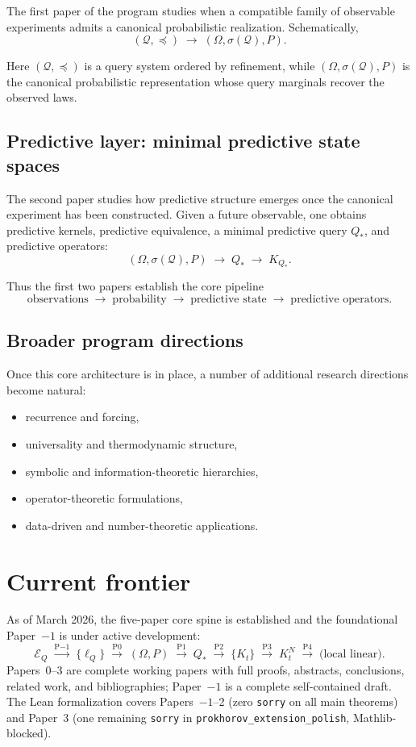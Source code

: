 \documentclass[11pt]{article}
\begin{document}
The first paper of the program studies when a compatible family of
observable experiments admits a canonical probabilistic realization.
Schematically,
\[
(\mathcal Q,\preceq)
\;\longrightarrow\;
(\Omega,\sigma(\mathcal Q),P).
\]

Here $(\mathcal Q,\preceq)$ is a query system ordered by refinement,
while $(\Omega,\sigma(\mathcal Q),P)$ is the canonical probabilistic
representation whose query marginals recover the observed laws.

\subsection{Predictive layer: minimal predictive state spaces}

The second paper studies how predictive structure emerges once the
canonical experiment has been constructed.  Given a future observable,
one obtains predictive kernels, predictive equivalence, a minimal
predictive query $Q_*$, and predictive operators:
\[
(\Omega,\sigma(\mathcal Q),P)
\;\longrightarrow\;
Q_*
\;\longrightarrow\;
K_{Q_*}.
\]

Thus the first two papers establish the core pipeline
\[
\text{observations}
\;\longrightarrow\;
\text{probability}
\;\longrightarrow\;
\text{predictive state}
\;\longrightarrow\;
\text{predictive operators}.
\]

\subsection{Broader program directions}

Once this core architecture is in place, a number of additional research
directions become natural:
\begin{itemize}
\item recurrence and forcing,
\item universality and thermodynamic structure,
\item symbolic and information-theoretic hierarchies,
\item operator-theoretic formulations,
\item data-driven and number-theoretic applications.
\end{itemize}

\section{Current frontier}

As of March 2026, the five-paper core spine is established and the
foundational Paper~$-1$ is under active development:
\[
\mathcal E_Q
\;\xrightarrow{\text{P$-1$}}\;
\{\ell_Q\}
\;\xrightarrow{\text{P0}}\;
(\Omega,P)
\;\xrightarrow{\text{P1}}\;
Q_*
\;\xrightarrow{\text{P2}}\;
\{K_t\}
\;\xrightarrow{\text{P3}}\;
K_t^N
\;\xrightarrow{\text{P4}}\;
\text{(local linear)}.
\]
Papers~0--3 are complete working papers with full proofs, abstracts,
conclusions, related work, and bibliographies; Paper~$-1$ is a complete
self-contained draft.  The Lean formalization covers Papers~$-1$--2
(zero \texttt{sorry} on all main theorems) and Paper~3 (one remaining
\texttt{sorry} in \texttt{prokhorov\_extension\_polish}, Mathlib-blocked).
\end{document}
